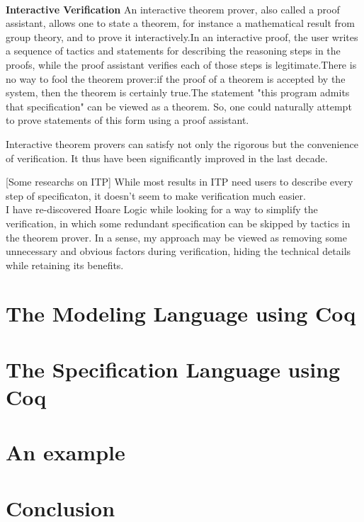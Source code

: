 \documentclass[runningheads,a4paper]{llncs}
\begin{document}
~\\
\noindent \textbf{Interactive Verification}\quad
An interactive theorem prover, also called a proof assistant, allows one to state a theorem, for instance a mathematical result from group theory, and to prove it interactively.In an interactive proof, the user writes a sequence of tactics and statements for describing the reasoning steps in the proofs, while the proof assistant verifies each of those steps is legitimate.There is no way to fool the theorem prover:if the proof of a theorem is accepted by the system, then the theorem is certainly true.The statement "this program admits that specification" can be viewed as a theorem. So, one could naturally attempt to prove statements of this form using a proof assistant.


Interactive theorem provers can satisfy not only the rigorous but the convenience of verification. It thus have been significantly improved in the last decade.

[Some researchs on ITP]
While most results in ITP need users to describe every step of specificaton, it doesn't seem to make verification much easier. 
\\
I have re-discovered Hoare Logic while looking for a way to simplify the verification, in which some redundant specification can be skipped by tactics in the theorem prover. In a sense, my approach may be viewed as removing some unnecessary and obvious factors during verification, hiding the technical details while retaining its benefits.

\section{The Modeling Language using Coq}
\section{The Specification Language using Coq}
\section{An example}
\section{Conclusion}
\end{document}
